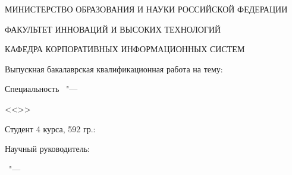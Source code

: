 \thispagestyle{empty}
\begin{center}
{\small \MakeUppercase{Министерство Образования и Науки Российской Федерации}}
\vspace{0pt plus2fill} %

{\small \MakeUppercase{\thesisOrganization}}

\vspace{0pt plus2fill} %
{\small \MakeUppercase{Факультет Инноваций и Высоких Технологий}}

{\small \MakeUppercase{Кафедра Корпоративных Информационных Систем}}
\end{center}

\begin{center}

\vspace{0pt plus4fill} %
Выпускная бакалаврская квалификационная работа на тему:

\textbf {\large %
\thesisTitle}

\vspace{0pt plus4fill} %

{%
Специальность \thesisSpecialtyNumber\ "---

<<\thesisSpecialtyTitle>>
}
\end{center}

\vspace{0pt plus6fill} %

\begin{flushright}
Студент 4 курса, 592 гр.:

\thesisAuthor

\vspace{0pt plus1fill} %

Научный руководитель:

\supervisorFio

\end{flushright}
%
\vspace{0pt plus4fill} %
{\centering\thesisCity\ "--- \thesisYear\par}
